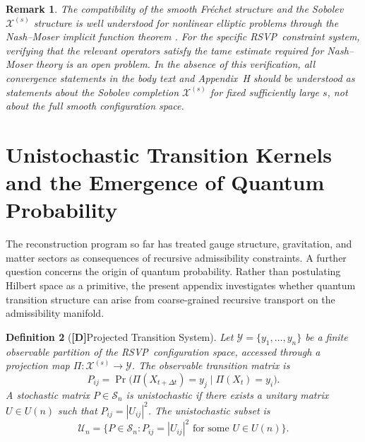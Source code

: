 \documentclass[12pt,a4paper]{article}
\newcommand{\claimD}{\textbf{[D]}\;}
\newtheorem{defn}{Definition}[section]
\newtheorem{appremark}[defn]{Remark}
\newcommand{\RSVP}{\textrm{RSVP}}
\newcommand{\Field}{\mathcal{X}}
\begin{document}
\begin{appremark}
The compatibility of the smooth Fr\'{e}chet structure and the Sobolev
$\Field^{(s)}$ structure is well understood for nonlinear elliptic problems
through the Nash--Moser implicit function theorem \cite{Hamilton1982b}. For the
specific \RSVP\ constraint system, verifying that the relevant operators satisfy
the tame estimate required for Nash--Moser theory is an open problem. In the
absence of this verification, all convergence statements in the body text and
Appendix~H should be understood as statements about the Sobolev completion
$\Field^{(s)}$ for fixed sufficiently large $s$, not about the full smooth
configuration space.
\end{appremark}

\section{Unistochastic Transition Kernels and the Emergence of Quantum Probability}

The reconstruction program so far has treated gauge structure, gravitation, and
matter sectors as consequences of recursive admissibility constraints. A further
question concerns the origin of quantum probability. Rather than postulating
Hilbert space as a primitive, the present appendix investigates whether quantum
transition structure can arise from coarse-grained recursive transport on the
admissibility manifold.

\begin{defn}[\claimD Projected Transition System]
Let $\mathcal{Y}=\{y_1,\ldots,y_n\}$ be a finite observable partition of
the \RSVP\ configuration space, accessed through a projection map
$\Pi:\Field^{(s)}\to\mathcal{Y}$. The observable transition matrix is
\[
P_{ij} = \Pr\bigl(\Pi(X_{t+\Delta t})=y_j\mid \Pi(X_t)=y_i\bigr).
\]
A stochastic matrix $P\in\mathcal{S}_n$ is \emph{unistochastic} if there
exists a unitary matrix $U\in U(n)$ such that $P_{ij}=|U_{ij}|^2$.
The \emph{unistochastic subset} is
\[
\mathcal{U}_n = \{P\in\mathcal{S}_n : P_{ij}=|U_{ij}|^2 \text{ for some } U\in U(n)\}.
\]
\end{defn}
\end{document}
